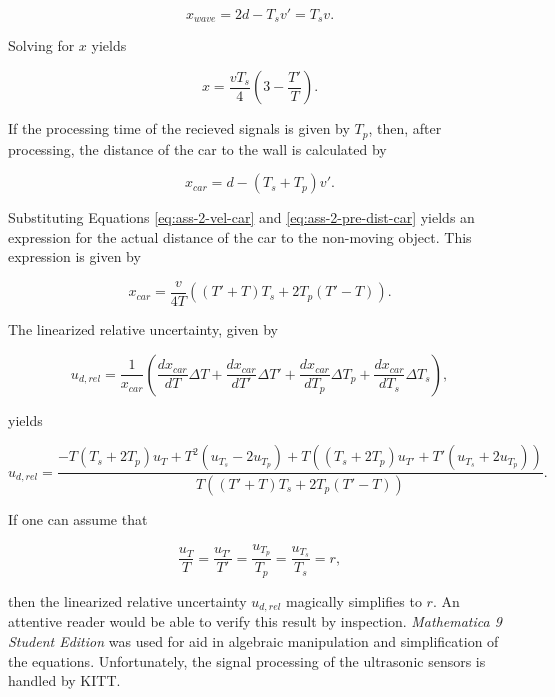 \documentclass[11pt,titlepage]{report}
\begin{document}
\begin{appendices}
\begin{equation}
	x_{wave} = 2 d - T_s v' = T_s v.
\end{equation}

Solving for $x$ yields

\begin{equation} \label{eq:ass-2-pre-dist-car}
	x = \frac{v T_s}{4} \left(3 - \frac{T'}{T} \right).
\end{equation}

If the processing time of the recieved signals is given by $T_p$, then, after processing, the distance of the car to the wall is calculated by

\begin{equation}
	x_{car} = d-(T_s +T_p) v'.
\end{equation}

Substituting Equations \ref{eq:ass-2-vel-car} and \ref{eq:ass-2-pre-dist-car} yields an expression for the actual distance of the car to the non-moving object. This expression is given by

\begin{equation}
	x_{car} = \frac{v}{4 T} \left((T'+T) T_s + 2 T_p (T'-T)  \right).
\end{equation}

The linearized relative uncertainty, given by

\begin{equation}
	u_{d,rel} = \frac{1}{x_{car}} \left( \frac{d x_{car}}{d T} \Delta T + \frac{d x_{car}}{d T'} \Delta T' + \frac{d x_{car}}{d T_p} \Delta T_p + \frac{d x_{car}}{d T_s} \Delta T_s \right),
\end{equation}

yields

\begin{equation}
	u_{d,rel} = \frac{
		-T(T_s + 2 T_p) u_T + T^2 (u_{T_s} - 2 u_{T_p}) + T \left( (T_s + 2 T_p) u_{T'} + T' (u_{T_s} + 2 u_{T_p}) \right)
	}{
		T \left( (T'+T)T_s + 2 T_p (T'-T) \right)
	}.
\end{equation}

If one can assume that

\begin{equation}
	\frac{u_T}{T} = \frac{u_{T'}}{T'} = \frac{u_{T_p}}{T_p} = \frac{u_{T_s}}{T_s}=r,
\end{equation}

then the linearized relative uncertainty $u_{d,rel}$ magically simplifies to $r$. An attentive reader would be able to verify this result by inspection. \textit{Mathematica 9 Student Edition} was used for aid in algebraic manipulation and simplification of the equations. Unfortunately, the signal processing of the ultrasonic sensors is handled by KITT.


\end{appendices}
\end{document}
